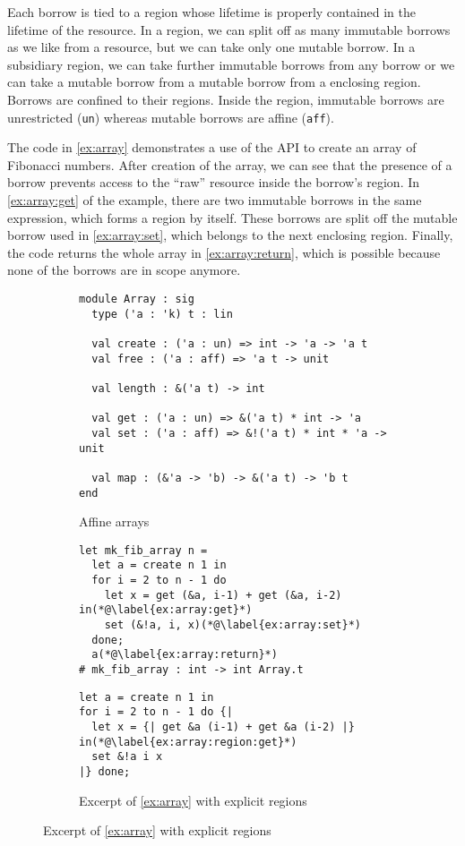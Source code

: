 Each borrow is tied to a region whose lifetime is properly
contained in the lifetime of the resource. 
In a region, we can split off as many immutable borrows as we like
from a resource, but we can take only one mutable borrow. In a
subsidiary region, we can take further immutable borrows from any
borrow or we can take a mutable borrow from a mutable borrow from a
enclosing region. Borrows are confined to their regions. Inside the region,
immutable borrows are unrestricted (\lstinline/un/) whereas mutable
borrows are affine (\lstinline/aff/).

The code in \cref{ex:array} demonstrates a use of the API to create an
array of Fibonacci numbers. After creation of the array, we can see
that the presence of a borrow prevents access to the ``raw'' 
resource inside the borrow's region. In \cref{ex:array:get} of the
example, there are two immutable borrows in the same
expression, which forms a region by itself. These borrows are split
off the mutable borrow used in \cref{ex:array:set}, which belongs to
the next enclosing region.
Finally, the code returns the whole array in \cref{ex:array:return},
which is possible because none of the borrows are in scope anymore.

\begin{figure}[tp]
  \centering
  \begin{subfigure}[t]{0.48\linewidth}
\begin{lstlisting}
module Array : sig
  type ('a : 'k) t : lin
  
  val create : ('a : un) => int -> 'a -> 'a t
  val free : ('a : aff) => 'a t -> unit

  val length : &('a t) -> int

  val get : ('a : un) => &('a t) * int -> 'a
  val set : ('a : aff) => &!('a t) * int * 'a -> unit
  
  val map : (&'a -> 'b) -> &('a t) -> 'b t
end
\end{lstlisting}
    \caption{Affine arrays}
    \label{sig:array}
  \end{subfigure}\hfill
  \begin{subfigure}[t]{0.5\linewidth}
\begin{lstlisting}
let mk_fib_array n =
  let a = create n 1 in
  for i = 2 to n - 1 do
    let x = get (&a, i-1) + get (&a, i-2) in(*@\label{ex:array:get}*)
    set (&!a, i, x)(*@\label{ex:array:set}*)
  done;
  a(*@\label{ex:array:return}*)
# mk_fib_array : int -> int Array.t
\end{lstlisting}
    \caption{Example of use of affine arrays}
    \label{ex:array}
\begin{lstlisting}
let a = create n 1 in
for i = 2 to n - 1 do {|
  let x = {| get &a (i-1) + get &a (i-2) |} in(*@\label{ex:array:region:get}*)
  set &!a i x
|} done;
\end{lstlisting}
    \caption{Excerpt of \cref{ex:array} with explicit regions}
    \label{ex:array:region}
  \end{subfigure}
\end{figure}

